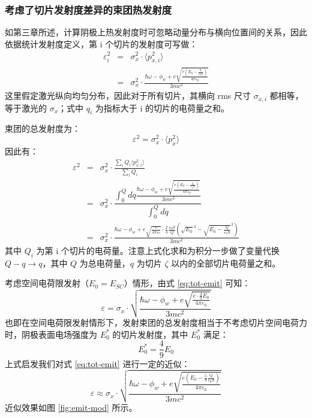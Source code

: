 \subsubsection{考虑了切片发射度差异的束团热发射度}
如第三章所述，计算阴极上热发射度时可忽略动量分布与横向位置间的关系，因此依据统计发射度定义，第 i 个切片的发射度可写做：
\begin{eqnarray*}
\varepsilon_i^2 &=& \sigma_x^2\cdot\langle p_{x,i}^2\rangle \\
&=& \sigma_x^2\cdot\frac{\hbar\omega-\phi_w+e\sqrt{\frac{e\left(E_0-\frac{q_i}{\varepsilon_0 S}\right)}{4\pi\varepsilon_0}}}{3mc^2}
\end{eqnarray*}
这里假定激光纵向均匀分布，因此对于所有切片，其横向 rms 尺寸 $\sigma_{x,i}$ 都相等，等于激光的 $\sigma_{x}$；式中 $q_i$ 为指标大于 i 的切片的电荷量之和。

束团的总发射度为：
\[
\varepsilon^2 = \sigma_x^2\cdot\langle p_{x}^2\rangle
\]
因此有：
\begin{eqnarray}
\varepsilon^2 &=& \sigma_x^2\cdot\frac{\sum\limits_i Q_i\langle p_{x,i}^2\rangle}{\sum\limits_iQ_i} \label{eq:tot-emit-orig}\\
&=& \sigma_x^2\cdot\dfrac{\displaystyle\int_0^{Q}dq\frac{\hbar\omega-\phi_w+e\sqrt{\frac{e\left(E_0-\frac{q}{\varepsilon_0 S}\right)}{4\pi\varepsilon_0}}}{3mc^2}}{\displaystyle\int_0^{Q}dq}\nonumber\\
&=&\sigma_x^2\cdot\frac{\hbar\omega-\phi_w+e\sqrt{\frac{e}{4\pi\varepsilon_0}}\cdot\frac{2}{3}\frac{\varepsilon_0 S}{Q}\left(\sqrt{E_0}^3-\sqrt{E_0-\frac{Q}{\varepsilon_0 S}}^3\right)}{3mc^2}
\label{eq:tot-emit}
\end{eqnarray}
其中 $Q_i$ 为第 i 个切片的电荷量。注意上式化求和为积分一步做了变量代换 $Q-q \to q$，其中 $Q$ 为总电荷量，$q$ 为切片 $\zeta$ 以内的全部切片电荷量之和。

考虑空间电荷限发射（$E_0=E_{SC}$）情形，由式 \ref{eq:tot-emit} 可知：
\begin{equation}
\varepsilon = \sigma_x\cdot\sqrt{\frac{\hbar\omega-\phi_w+e\sqrt{\frac{e\cdot\frac{4}{9}E_0}{4\pi\varepsilon_0}}}{3mc^2}}
\end{equation}
也即在空间电荷限发射情形下，发射束团的总发射度相当于不考虑切片空间电荷力时，阴极表面电场强度为 $E_0^*$ 的切片发射度，其中 $E_0^*$ 满足：
\begin{equation}
E_0^*=\frac{4}{9}E_0
\end{equation}
上式启发我们对式 \ref{eq:tot-emit} 进行一定的近似：
\begin{equation}
\varepsilon \approx \sigma_x\cdot\sqrt{\frac{\hbar\omega-\phi_w+e\sqrt{\frac{e\left(E_0-\frac{5}{9}\frac{Q}{\varepsilon_0 S}\right)}{4\pi\varepsilon_0}}}{3mc^2}}
\label{eq:tot-emit-approx}
\end{equation}
近似效果如图 \ref{fig:emit-mod} 所示。

